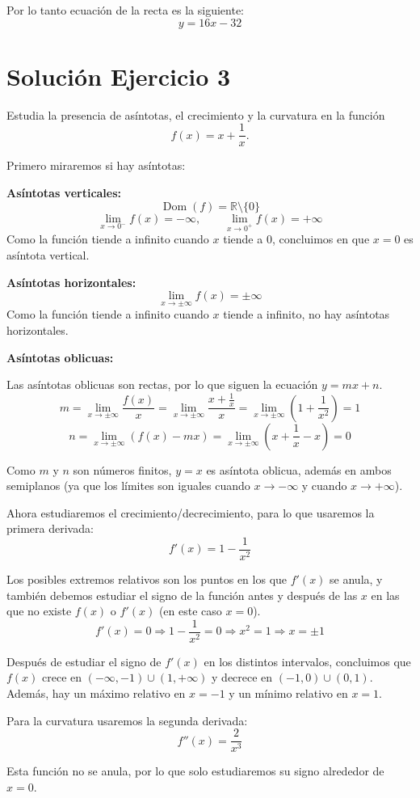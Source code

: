 \documentclass[12pt]{article}
\begin{document}
Por lo tanto ecuación de la recta es la siguiente:
\[
y=16x-32
\]

\section*{Solución Ejercicio 3}
Estudia la presencia de asíntotas, el crecimiento y la curvatura en la función
\[
f(x)=x+\frac{1}{x}.
\]

Primero miraremos si hay asíntotas:

\textbf{Asíntotas verticales:}
\[
\operatorname{Dom}(f)=\mathbb{R}\setminus\{0\}
\]
\[
\lim_{x\to 0^-} f(x)=-\infty,
\qquad
\lim_{x\to 0^+} f(x)=+\infty
\]
Como la función tiende a infinito cuando \(x\) tiende a \(0\), concluimos en que
\(x=0\) es asíntota vertical.

\textbf{Asíntotas horizontales:}
\[
\lim_{x\to \pm\infty} f(x)=\pm\infty
\]
Como la función tiende a infinito cuando \(x\) tiende a infinito, no hay asíntotas
horizontales.

\textbf{Asíntotas oblicuas:}

Las asíntotas oblicuas son rectas, por lo que siguen la ecuación \(y=mx+n\).
\[
m=\lim_{x\to \pm\infty}\frac{f(x)}{x}
=\lim_{x\to \pm\infty}\frac{x+\frac{1}{x}}{x}
=\lim_{x\to \pm\infty}\left(1+\frac{1}{x^2}\right)=1
\]
\[
n=\lim_{x\to \pm\infty}(f(x)-mx)
=\lim_{x\to \pm\infty}\left(x+\frac{1}{x}-x\right)=0
\]

Como \(m\) y \(n\) son números finitos, \(y=x\) es asíntota oblicua, además en
ambos semiplanos (ya que los límites son iguales cuando \(x\to -\infty\) y cuando
\(x\to +\infty\)).

Ahora estudiaremos el crecimiento/decrecimiento, para lo que usaremos la primera
derivada:
\[
f'(x)=1-\frac{1}{x^2}
\]

Los posibles extremos relativos son los puntos en los que \(f'(x)\) se anula, y
también debemos estudiar el signo de la función antes y después de las \(x\) en las
que no existe \(f(x)\) o \(f'(x)\) (en este caso \(x=0\)).
\[
f'(x)=0 \Rightarrow 1-\frac{1}{x^2}=0 \Rightarrow x^2=1 \Rightarrow x=\pm 1
\]

Después de estudiar el signo de \(f'(x)\) en los distintos intervalos, concluimos que
\(f(x)\) crece en \((-\infty,-1)\cup(1,+\infty)\) y decrece en \((-1,0)\cup(0,1)\).
Además, hay un máximo relativo en \(x=-1\) y un mínimo relativo en \(x=1\).

Para la curvatura usaremos la segunda derivada:
\[
f''(x)=\frac{2}{x^3}
\]

Esta función no se anula, por lo que solo estudiaremos su signo alrededor de
\(x=0\).
\end{document}
